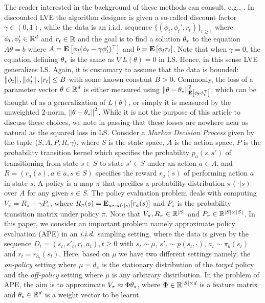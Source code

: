 \begin{example}
\label{ex:ape}
The reader interested in the background of these methods can consult, e.g., \cite{sutton,Sze10}.
In discounted LVE the algorithm designer is given a so-called discount factor
 $\gamma\in (0,1)$, while the data is an i.i.d. sequence $\{(\phi_t,\phi_t',r_t)\}_{t\ge 1}$ where
$\phi_t,\phi_t'\in \mathbb{R}^d$ and $r_t\in \mathbb{R}$ and the goal is to find a solution $\theta_*$ to the equation $A \theta = b$
where $A =\mathbf{E}\left[ \phi_t(\phi_t - \gamma \phi_t')^\top\right]$ and $b =\mathbf{E}\left[ \phi_t r_t\right]$.
Note that when $\gamma=0$, the equation defining $\theta_*$ is the same as $\nabla L(\theta)=0$ in LS. 
Hence, in this sense LVE generalizes LS.
Again, it is customary to assume that the data is bounded: 
$\left\| \phi_t\right\|,\left\| \phi_t'\right\|,|r_t|\le B$ with some known 
constant $B>0$. 
Commonly, the loss of a parameter vector $\theta\in \mathbb{R}^d$ is either measured using $\left\| \theta-\theta_*\right\|_{\mathbf{E}\left[\phi_t \phi_t^\top\right]}^2$, which can be thought of as a generalization of $L(\theta)$, or simply it is measured by 
the unweighted $2$-norm, $\left\| \theta-\theta_*\right\|^2$. 
While it is not the purpose of this article to discuss these choices, we note in passing that these losses
are nowhere near as natural as the squared loss in LS.
Consider a \emph{Markov Decision Process} given by the tuple $\langle S,A,P,R,\gamma \rangle$, where $S$ is the state space, $A$ is the action space, $P$ is the probability transition kernel which specifies the probability $p_a(s,s')$ of transitioning from state $s\in S$ to state $s'\in S$ under an action $a\in A$, and $R=(r_a(s),a\in a,s\in S)$ specifies the reward $r_a(s)$ of performing action $a$ in state $s$. A policy is a map $\pi$ that specifies a probability distribution $\pi(\cdot | s)$ over $A$ for any given $s \in S$. The policy evaluation problem deals with computing $V_\pi=R_\pi+\gamma P_\pi$, where $R_\pi(s)=\mathbf{E}_{a\sim \pi(\cdot|s)}[r_a(s)]$ and $P_\pi$ is the probability transition matrix under policy $\pi$. Note that $V_\pi,R_\pi \in \mathbb{R}^{|S|}$ and $P_\pi\in\mathbb{R}^{|S|\times|S|}$. 
In this paper, we consider an important problem namely approximate policy evaluation (APE) in an $\emph{i.i.d.}$ sampling setting, where the data is given by the sequence  $D_t=(s_t,s'_t,r_t,a_t),t\geq 0$ with $s_t\sim \mu$,  $s'_t\sim p(s_t,\cdot)$, $a_t\sim\pi_b(s_t)$ and $r_t=r_{a_t}(s_t)$. Here, based on $\mu$ we have two different settings namely, the \emph{on-policy} setting where $\mu=d_{\pi}$ is the stationary distribution of  the \emph{target} policy and the \emph{off-policy} setting where $\mu$ is any arbitrary distribution. In the problem of APE, the aim is to approximate $V_\pi \approx \Phi \theta_*$, where $\Phi\in \mathbb{R}^{|S|\times d}$ is a feature matrix and $\theta_*\in\mathbb{R}^d$ is a weight vector to be learnt.

\end{example}
